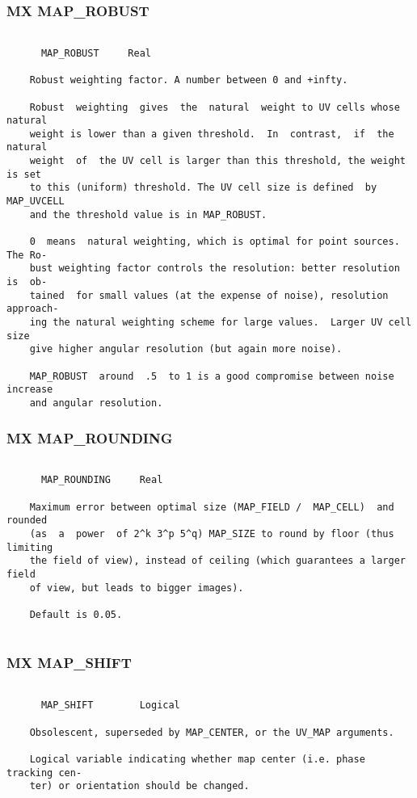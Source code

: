\subsubsection{MX MAP\_ROBUST}
\begin{verbatim}

      MAP_ROBUST     Real

    Robust weighting factor. A number between 0 and +infty.

    Robust  weighting  gives  the  natural  weight to UV cells whose natural
    weight is lower than a given threshold.  In  contrast,  if  the  natural
    weight  of  the UV cell is larger than this threshold, the weight is set
    to this (uniform) threshold. The UV cell size is defined  by  MAP_UVCELL
    and the threshold value is in MAP_ROBUST.

    0  means  natural weighting, which is optimal for point sources. The Ro-
    bust weighting factor controls the resolution: better resolution is  ob-
    tained  for small values (at the expense of noise), resolution approach-
    ing the natural weighting scheme for large values.  Larger UV cell  size
    give higher angular resolution (but again more noise).

    MAP_ROBUST  around  .5  to 1 is a good compromise between noise increase
    and angular resolution.

\end{verbatim}
\subsubsection{MX MAP\_ROUNDING}
\begin{verbatim}

      MAP_ROUNDING     Real

    Maximum error between optimal size (MAP_FIELD /  MAP_CELL)  and  rounded
    (as  a  power  of 2^k 3^p 5^q) MAP_SIZE to round by floor (thus limiting
    the field of view), instead of ceiling (which guarantees a larger  field
    of view, but leads to bigger images).

    Default is 0.05.


\end{verbatim}
\subsubsection{MX MAP\_SHIFT}
\begin{verbatim}

      MAP_SHIFT        Logical

    Obsolescent, superseded by MAP_CENTER, or the UV_MAP arguments.

    Logical variable indicating whether map center (i.e. phase tracking cen-
    ter) or orientation should be changed.

\end{verbatim}
